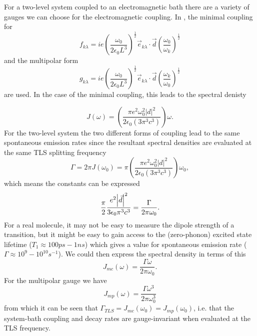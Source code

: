 \documentclass[]{article}
\begin{document}
For a two-level system coupled to an electromagnetic bath there are a variety of gauges we can choose for the electromagnetic coupling. In \cite{Stokes2012}, the minimal coupling for
\begin{equation}
\label{eq:MinimalCouplingConst}
f_{k\lambda} = i e \left(\frac{\omega_0}{2\epsilon_0 L^3}\right)^{\frac{1}{2}} \vec{e}_{k \lambda}\cdot\vec{d} \left(\frac{\omega_0}{\omega_k}\right)^{\frac{1}{2}} 
\end{equation}
and the multipolar form
\begin{equation}
\label{eq:MultipolarCouplingConst}
g_{k\lambda} = i e \left(\frac{\omega_0}{2\epsilon_0 L^3}\right)^{\frac{1}{2}} \vec{e}_{k \lambda}\cdot\vec{d} \left(\frac{\omega_k}{\omega_0}\right)^{\frac{1}{2}} 
\end{equation}
are used. 
In the case of the minimal coupling, this leads to the spectral denisty

\begin{equation}
J(\omega) = \left(\frac{\pi e^2\omega_0^2 |d|^2}{2\epsilon_0(3\pi^3 c^3)}\right)\omega.
\end{equation}
For the two-level system the two different forms of coupling lead to the same spontaneous emission rates since the resultant spectral densities are evaluated at the same TLS splitting frequency
\begin{equation}
\label{eq:TLS_decay}
\Gamma = 2\pi J(\omega_0) = \pi\left(\frac{\pi e^2\omega_0^2 |d|^2}{2\epsilon_0(3\pi^3 c^3)}\right)\omega_0,
\end{equation}
which means the constants can be expressed
\begin{equation}
\frac{\pi}{2} \frac{e^2\abs{\vec{d}}^2}{3\epsilon_0\pi^3c^3} = \frac{\Gamma}{2\pi\omega_0}.
\end{equation}
For a real molecule, it may not be easy to measure the dipole strength of a transition, but it might be easy to gain access to the (zero-phonon) excited state lifetime ($T_1 \approx 100ps - 1ns$) which gives a value for spontaneous emission rate ($\Gamma\approx 10^9-10^{10}s^{-1}$). We could then express the spectral density in terms of this
\begin{equation}
\label{eq:MinimalSpectral}
J_{mc}(\omega) = \frac{\Gamma\omega}{2\pi\omega_0}.
\end{equation}
For the multipolar gauge we have
\begin{equation}
\label{eq:MultipolarSpectral}
J_{mp}(\omega) = \frac{\Gamma\omega^3}{2\pi\omega_0^3}
\end{equation}
from which it can be seen that $\Gamma_{TLS}=J_{mc}(\omega_0)=J_{mp}(\omega_0)$, i.e. that the system-bath coupling and decay rates are gauge-invariant when evaluated at the TLS frequency.
\end{document}
